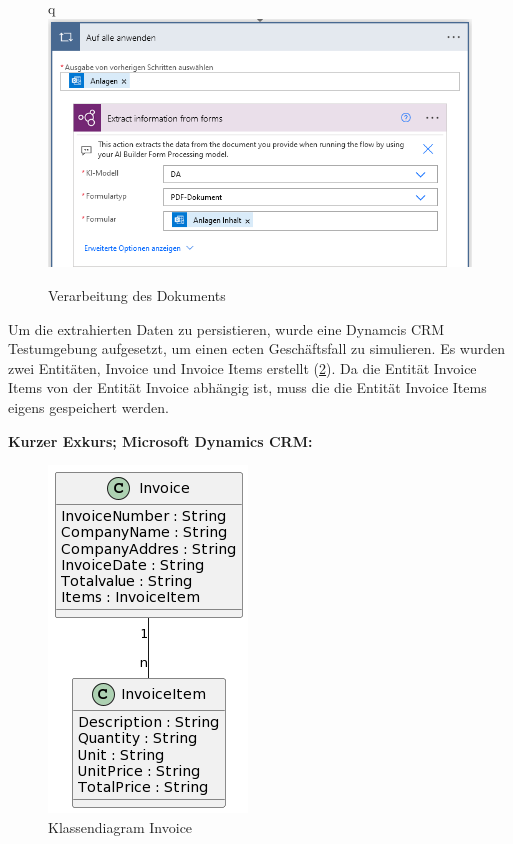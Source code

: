 \begin{figure}[H]q
    \centering
    \includegraphics[scale=0.8]{sections/cloud-computing/images/power-automate-flow/ai-model-in-use.png}
    \caption{Verarbeitung des Dokuments}
    \label{fig:ai-model-in-use}
\end{figure}

Um die extrahierten Daten zu persistieren, wurde eine Dynamcis CRM Testumgebung aufgesetzt, um einen ecten Geschäftsfall zu simulieren. Es wurden zwei Entitäten, Invoice und Invoice Items erstellt (\ref{fig:class-diagram}). Da die Entität Invoice Items von der Entität Invoice abhängig ist, muss die die Entität Invoice Items eigens gespeichert werden.

\textbf{Kurzer Exkurs; Microsoft Dynamics CRM:}


\begin{figure}[h]
    \centering
    \includegraphics[scale=0.5]{sections/cloud-computing/images/power-automate-flow/cld.png}
    \caption{Klassendiagram Invoice}
    \label{fig:class-diagram}
\end{figure}

